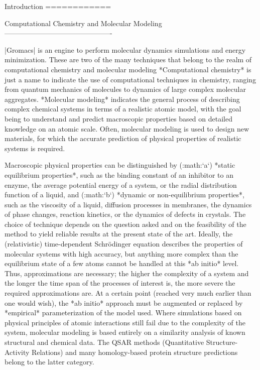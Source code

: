 Introduction
============

Computational Chemistry and Molecular Modeling
----------------------------------------------

|Gromacs| is an engine to perform molecular dynamics simulations and
energy minimization. These are two of the many techniques that belong to
the realm of computational
chemistry
and molecular
modeling
*Computational chemistry* is just a name to indicate the use of
computational techniques in chemistry, ranging from quantum mechanics of
molecules to dynamics of large complex molecular aggregates. *Molecular
modeling* indicates the general process of describing complex chemical
systems in terms of a realistic atomic model, with the goal being to
understand and predict macroscopic properties based on detailed
knowledge on an atomic scale. Often, molecular modeling is used to
design new materials, for which the accurate prediction of physical
properties of realistic systems is required.

Macroscopic physical properties can be distinguished by (:math:`a`)
*static equilibrium properties*, such as the binding constant of an
inhibitor to an enzyme, the average potential energy of a system, or the
radial distribution function of a liquid, and (:math:`b`) *dynamic or
non-equilibrium properties*, such as the viscosity of a liquid,
diffusion processes in membranes, the dynamics of phase changes,
reaction kinetics, or the dynamics of defects in crystals. The choice of
technique depends on the question asked and on the feasibility of the
method to yield reliable results at the present state of the art.
Ideally, the (relativistic) time-dependent Schrödinger
equation
describes the properties of molecular systems with high accuracy, but
anything more complex than the equilibrium state of a few atoms cannot
be handled at this *ab initio* level. Thus, approximations are
necessary; the higher the complexity of a system and the longer the time
span of the processes of interest is, the more severe the required
approximations are. At a certain point (reached very much earlier than
one would wish), the *ab initio* approach must be augmented or replaced
by *empirical* parameterization of the model used. Where simulations
based on physical principles of atomic interactions still fail due to
the complexity of the system, molecular modeling is based entirely on a
similarity analysis of known structural and chemical data. The
QSAR
methods (Quantitative Structure-Activity
Relations) and many homology-based protein structure predictions belong
to the latter category.

